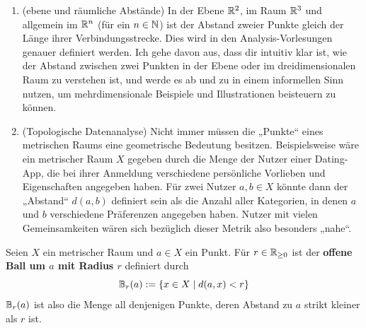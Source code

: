 \begin{bsp} \quad
    \begin{enumerate}
        \item(ebene und räumliche Abstände) In der Ebene $\mathbb R^2$, im Raum $\mathbb R^3$ und allgemein im $\mathbb R^n$ (für ein $n\in \mathbb N$) ist der Abstand zweier Punkte gleich der Länge ihrer Verbindungsstrecke. Dies wird in den Analysis-Vorlesungen genauer definiert werden. %
        Ich gehe davon aus, dass dir intuitiv klar ist, wie der Abstand zwischen zwei Punkten in der Ebene oder im dreidimensionalen Raum zu verstehen ist, und werde es ab und zu in einem informellen Sinn nutzen, um mehrdimensionale Beispiele und Illustrationen beisteuern zu können.
        \item(Topologische Datenanalyse) Nicht immer müssen die „Punkte“ eines metrischen Raums eine geometrische Bedeutung besitzen. Beispielsweise wäre ein metrischer Raum $X$ gegeben durch die Menge der Nutzer einer Dating-App, die bei ihrer Anmeldung verschiedene persönliche Vorlieben und Eigenschaften angegeben haben. Für zwei Nutzer $a,b\in X$ könnte dann der „Abstand“ $d(a,b)$ definiert sein als die Anzahl aller Kategorien, in denen $a$ und $b$ verschiedene Präferenzen angegeben haben. Nutzer mit vielen Gemeinsamkeiten wären sich bezüglich dieser Metrik also besonders „nahe“.
    \end{enumerate}
\end{bsp}


\begin{defin} \label{def:ball} 
    Seien $X$ ein metrischer Raum und $a\in X$ ein Punkt. Für $r\in \mathbb R_{\ge 0}$ ist der \textbf{offene Ball um $a$ mit Radius $r$} definiert durch
        \[ \mathbb B_r(a) := \{ x\in X \mid d(a,x)< r\} \]
    $\mathbb B_r(a)$ ist also die Menge all denjenigen Punkte, deren Abstand zu $a$ strikt kleiner als $r$ ist.
\end{defin}


